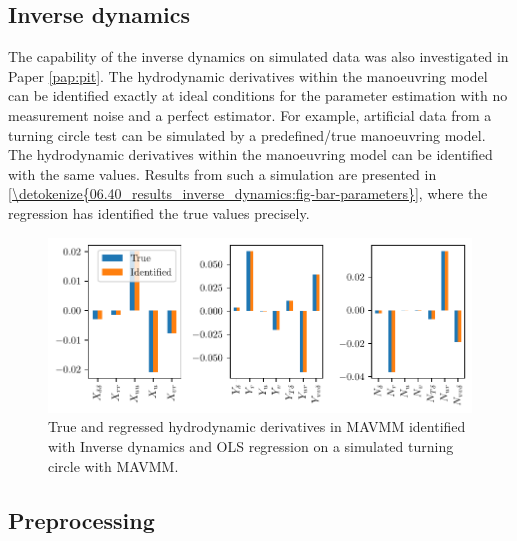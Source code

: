 \subsection{Inverse dynamics}
\label{\detokenize{06.40_results_inverse_dynamics:inverse-dynamics}}\label{\detokenize{06.40_results_inverse_dynamics::doc}}
The capability of the inverse dynamics on simulated data was also investigated in Paper \ref{pap:pit}. The hydrodynamic derivatives within the manoeuvring model can be identified exactly at ideal conditions for the parameter estimation with no measurement noise and a perfect estimator. For example, artificial data from a turning circle test can be simulated by a predefined/true manoeuvring model. The hydrodynamic derivatives within the manoeuvring model can be identified with the same values. Results from such a simulation are presented in \hyperref[\detokenize{06.40_results_inverse_dynamics:fig-bar-parameters}]{\autoref{\detokenize{06.40_results_inverse_dynamics:fig-bar-parameters}}}, where the regression has identified the true values precisely.
\begin{figure}[h!]
\centering
\includegraphics[width=\linewidth]{kappa/images/5.pdf}
\caption{True and regressed hydrodynamic derivatives in MAVMM identified with Inverse dynamics and OLS regression on a simulated turning circle with MAVMM.}\label{\detokenize{06.40_results_inverse_dynamics:fig-bar-parameters}}\end{figure}


\subsection{Preprocessing}
\label{\detokenize{06.31_results_noise:preprocessing}}\label{\detokenize{06.31_results_noise::doc}}

